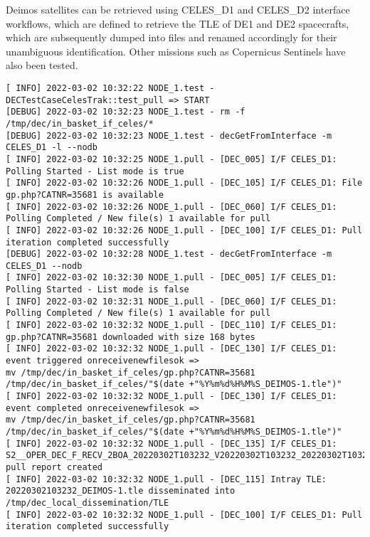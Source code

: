 \documentclass[dec_sum_main.tex]{subfiles}
\begin{document}
\par
\noindent
Deimos satellites can be retrieved using CELES\_D1 and CELES\_D2 interface workflows, which are defined to retrieve the TLE of DE1 and DE2 spacecrafts, which are subsequently dumped into files and renamed accordingly for their unambiguous identification. Other missions such as Copernicus Sentinels have also been tested.\newline
	
 \newline

\begin{Verbatim}[fontsize=\tiny]
[ INFO] 2022-03-02 10:32:22 NODE_1.test - DECTestCaseCelesTrak::test_pull => START
[DEBUG] 2022-03-02 10:32:23 NODE_1.test - rm -f /tmp/dec/in_basket_if_celes/*
[DEBUG] 2022-03-02 10:32:23 NODE_1.test - decGetFromInterface -m CELES_D1 -l --nodb
[ INFO] 2022-03-02 10:32:25 NODE_1.pull - [DEC_005] I/F CELES_D1: Polling Started - List mode is true
[ INFO] 2022-03-02 10:32:26 NODE_1.pull - [DEC_105] I/F CELES_D1: File gp.php?CATNR=35681 is available
[ INFO] 2022-03-02 10:32:26 NODE_1.pull - [DEC_060] I/F CELES_D1: Polling Completed / New file(s) 1 available for pull
[ INFO] 2022-03-02 10:32:26 NODE_1.pull - [DEC_100] I/F CELES_D1: Pull iteration completed successfully
[DEBUG] 2022-03-02 10:32:28 NODE_1.test - decGetFromInterface -m CELES_D1 --nodb
[ INFO] 2022-03-02 10:32:30 NODE_1.pull - [DEC_005] I/F CELES_D1: Polling Started - List mode is false
[ INFO] 2022-03-02 10:32:31 NODE_1.pull - [DEC_060] I/F CELES_D1: Polling Completed / New file(s) 1 available for pull
[ INFO] 2022-03-02 10:32:32 NODE_1.pull - [DEC_110] I/F CELES_D1: gp.php?CATNR=35681 downloaded with size 168 bytes
[ INFO] 2022-03-02 10:32:32 NODE_1.pull - [DEC_130] I/F CELES_D1: event triggered onreceivenewfilesok => 
mv /tmp/dec/in_basket_if_celes/gp.php?CATNR=35681 /tmp/dec/in_basket_if_celes/"$(date +"%Y%m%d%H%M%S_DEIMOS-1.tle")"
[ INFO] 2022-03-02 10:32:32 NODE_1.pull - [DEC_130] I/F CELES_D1: event completed onreceivenewfilesok => 
mv /tmp/dec/in_basket_if_celes/gp.php?CATNR=35681 /tmp/dec/in_basket_if_celes/"$(date +"%Y%m%d%H%M%S_DEIMOS-1.tle")"
[ INFO] 2022-03-02 10:32:32 NODE_1.pull - [DEC_135] I/F CELES_D1: S2__OPER_DEC_F_RECV_2BOA_20220302T103232_V20220302T103232_20220302T103232_CELES_D1.xml pull report created
[ INFO] 2022-03-02 10:32:32 NODE_1.pull - [DEC_115] Intray TLE: 20220302103232_DEIMOS-1.tle disseminated into /tmp/dec_local_dissemination/TLE
[ INFO] 2022-03-02 10:32:32 NODE_1.pull - [DEC_100] I/F CELES_D1: Pull iteration completed successfully

\end{Verbatim}
\end{document}
